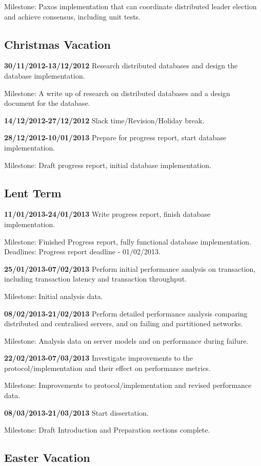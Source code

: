 Milestone: Paxos implementation that can coordinate distributed leader election and achieve
consensus, including unit tests.

\subsection*{Christmas Vacation}

{\bf 30/11/2012-13/12/2012} Research distributed databases and design the database implementation.

Milestone: A write up of research on distributed databases and a design document for the database.

{\bf 14/12/2012-27/12/2012} Slack time/Revision/Holiday break.

{\bf 28/12/2012-10/01/2013} Prepare for progress report, start database implementation.

Milestone: Draft progress report, initial database implementation.

\subsection*{Lent Term}
{\bf 11/01/2013-24/01/2013} Write progress report, finish database implementation.

Milestone: Finished Progress report, fully functional database implementation.
Deadlines: Progress report deadline - 01/02/2013.

{\bf 25/01/2013-07/02/2013} Perform initial performance analysis on transaction, including
transaction latency and transaction throughput.

Milestone: Initial analysis data.

{\bf 08/02/2013-21/02/2013} Perform detailed performance analysis comparing distributed and
centralised servers, and on failing and partitioned networks.

Milestone: Analysis data on server models and on performance during failure.

{\bf 22/02/2013-07/03/2013} Investigate improvements to the protocol/implementation and their effect on
performance metrics.

Milestone: Improvements to protocol/implementation and revised performance data.

{\bf 08/03/2013-21/03/2013} Start dissertation.

Milestone: Draft Introduction and Preparation sections complete.

\subsection*{Easter Vacation}

